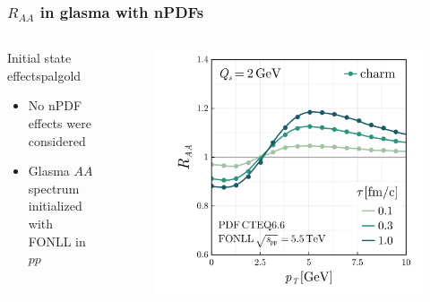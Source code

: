 \documentclass[aspectratio=169,11pt,usenames,dvipsnames]{beamer}
\begin{document}

\begin{frame}
    \frametitle{$R_{AA}$ in glasma with nPDFs}
    \vspace{-15pt}
    \begin{center}
        \begin{columns}[onlytextwidth,t]
           \begin{center}
                \begin{custombox}{\normalsize Initial state effects}{palgold}
                    \small
                    \begin{varwidth}{0.88\textwidth}
                    \begin{itemize}
                        \itemsep0em
                        \footnotesize
                        \item No nPDF effects were considered 
                        \item Glasma $AA$ spectrum initialized with FONLL in $pp$
                    \end{itemize}
                    \end{varwidth}
                \end{custombox}
            \end{center}
            \vspace{-10pt}
           \begin{figure}
                \centering
                \includegraphics[width=0.9\columnwidth]{images/clean_raa_tau_dep_quarks_charmQs_2.0_fonll_energy_5500_pdf_cteq.png}

\end{figure}
\end{columns}
\end{center}
\end{frame}
\end{document}

